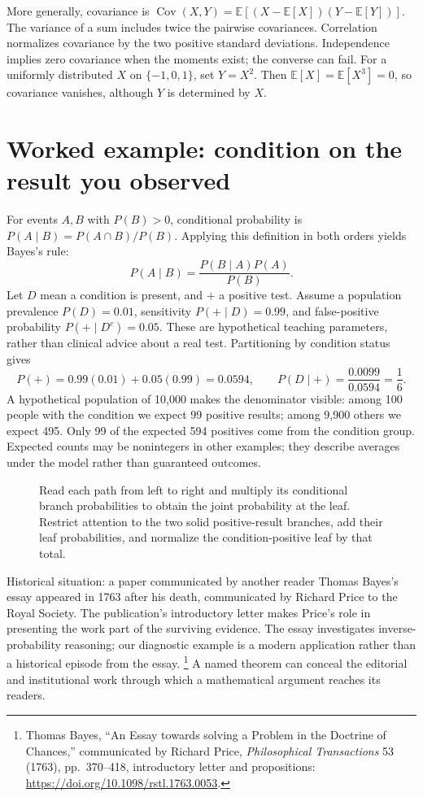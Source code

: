 More generally, covariance is
$\operatorname{Cov}(X,Y)=\mathbb E[(X-\mathbb E[X])(Y-\mathbb E[Y])]$.
The variance of a sum includes twice the pairwise covariances. Correlation
normalizes covariance by the two positive standard deviations. Independence
implies zero covariance when the moments exist; the converse can fail.
For a uniformly distributed $X$ on $\{-1,0,1\}$, set $Y=X^2$.
Then $\mathbb E[X]=\mathbb E[X^3]=0$, so covariance vanishes, although
$Y$ is determined by $X$.

\section{Worked example: condition on the result you observed}
For events $A,B$ with $P(B)>0$, conditional probability is
$P(A\mid B)=P(A\cap B)/P(B)$. Applying this definition in both orders
yields Bayes's rule:
\[
 P(A\mid B)=\frac{P(B\mid A)P(A)}{P(B)}.
\]
Let $D$ mean a condition is present, and $+$ a positive test. Assume a
population prevalence $P(D)=0.01$, sensitivity $P(+\mid D)=0.99$,
and false-positive probability $P(+\mid D^c)=0.05$. These are hypothetical
teaching parameters, rather than clinical advice about a real test.
Partitioning by condition status gives
\[
 P(+)=0.99(0.01)+0.05(0.99)=0.0594,
 \qquad P(D\mid+)=\frac{0.0099}{0.0594}=\frac16.
\]
A hypothetical population of 10,000 makes the denominator visible: among
100 people with the condition we expect 99 positive results; among 9,900
others we expect 495. Only 99 of the expected 594 positives come from the
condition group. Expected counts may be nonintegers in other examples;
they describe averages under the model rather than guaranteed outcomes.

\begin{figure}[htbp]
  \centering
  
  \caption{Read each path from left to right and multiply its conditional branch probabilities to obtain the joint probability at the leaf. Restrict attention to the two solid positive-result branches, add their leaf probabilities, and normalize the condition-positive leaf by that total.}
  \label{fig:learn:bayes_tree}
\end{figure}

\begin{learningcard}[breakable=false]{Historical situation: a paper communicated by another reader}
Thomas Bayes's essay appeared in 1763 after his death, communicated by
Richard Price to the Royal Society. The publication's introductory letter
makes Price's role in presenting the work part of the surviving evidence.
The essay investigates inverse-probability reasoning; our diagnostic example
is a modern application rather than a historical episode from the essay.
\footnote{Thomas Bayes, ``An Essay towards solving a Problem in the
Doctrine of Chances,'' communicated by Richard Price,
\emph{Philosophical Transactions} 53 (1763), pp.~370--418, introductory
letter and propositions:
\url{https://doi.org/10.1098/rstl.1763.0053}.}
A named theorem can conceal the editorial and institutional work through
which a mathematical argument reaches its readers.
\end{learningcard}

